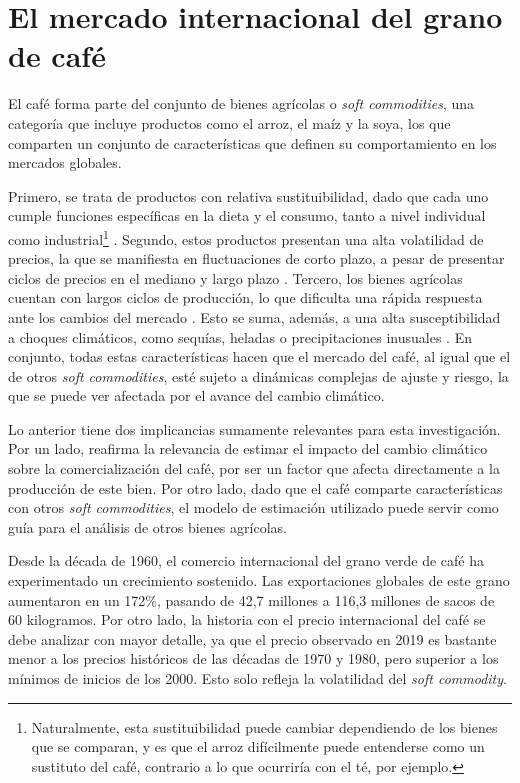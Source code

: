 \chapter{El mercado internacional del grano de café}
\label{chap:mercado}

El café forma parte del conjunto de bienes agrícolas o \textit{soft commodities}, una categoría que incluye productos como el arroz, el maíz y la soya, los que comparten un conjunto de características que definen su comportamiento en los mercados globales.

Primero, se trata de productos con relativa sustituibilidad, dado que cada uno cumple funciones específicas en la dieta y el consumo, tanto a nivel individual como industrial\footnote{Naturalmente, esta sustituibilidad puede cambiar dependiendo de los bienes que se comparan, y es que el arroz difícilmente puede entenderse como un sustituto del café, contrario a lo que ocurriría con el té, por ejemplo.} \citep{gouel2018nutrition}. Segundo, estos productos presentan una alta volatilidad de precios, la que se manifiesta en fluctuaciones de corto plazo, a pesar de presentar ciclos de precios en el mediano y largo plazo \citep{deaton1992behaviour, maurice2011unraveling, covindassamy2017sugar}. Tercero, los bienes agrícolas cuentan con largos ciclos de producción, lo que dificulta una rápida respuesta ante los cambios del mercado \citep{mehta2008responding}. Esto se suma, además, a una alta susceptibilidad a choques climáticos, como sequías, heladas o precipitaciones inusuales \citep{oic2013cincuenta}. En conjunto, todas estas características hacen que el mercado del café, al igual que el de otros \textit{soft commodities}, esté sujeto a dinámicas complejas de ajuste y riesgo, la que se puede ver afectada por el avance del cambio climático.

Lo anterior tiene dos implicancias sumamente relevantes para esta investigación. Por un lado, reafirma la relevancia de estimar el impacto del cambio climático sobre la comercialización del café, por ser un factor que afecta directamente a la producción de este bien. Por otro lado, dado que el café comparte características con otros \textit{soft commodities}, el modelo de estimación utilizado puede servir como guía para el análisis de otros bienes agrícolas.

Desde la década de 1960, el comercio internacional del grano verde de café ha experimentado un crecimiento sostenido. Las exportaciones globales de este grano aumentaron en un 172\%, pasando de 42,7 millones a 116,3 millones de sacos de 60 kilogramos. Por otro lado, la historia con el precio internacional del café se debe analizar con mayor detalle, ya que el precio observado en 2019 es bastante menor a los precios históricos de las décadas de 1970 y 1980, pero superior a los mínimos de inicios de los 2000. Esto solo refleja la volatilidad del \textit{soft commodity}.

